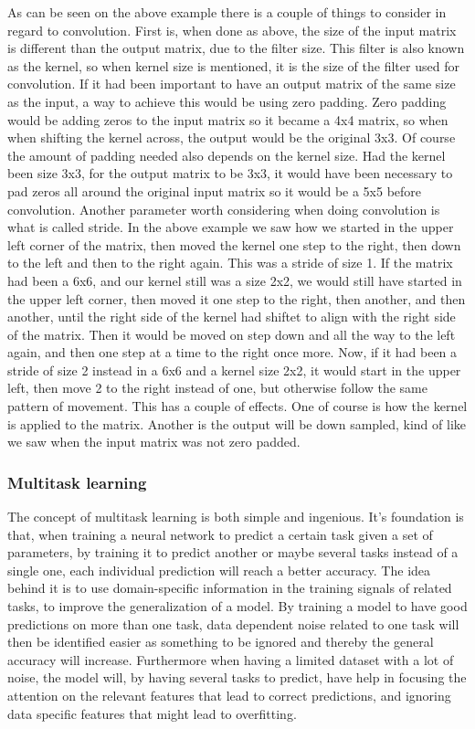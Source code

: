 As can be seen on the above example there is a couple of things to consider in regard to convolution. First is, when done as above, the size of the input matrix is different than the output matrix, due to the filter size. This filter is also known as the kernel, so when kernel size is mentioned, it is the size of the filter used for convolution. If it had been important to have an output matrix of the same size as the input, a way to achieve this would be using zero padding. Zero padding would be adding zeros to the input matrix so it became a 4x4 matrix, so when when shifting the kernel across, the output would be the original 3x3. Of course the amount of padding needed also depends on the kernel size. Had the kernel been size 3x3, for the output matrix to be 3x3, it would have been necessary to pad zeros all around the original input matrix so it would be a 5x5 before convolution. Another parameter worth considering when doing convolution is what is called stride. In the above example we saw how we started in the upper left corner of the matrix, then moved the kernel one step to the right, then down to the left and then to the right again. This was a stride of size 1. If the matrix had been a 6x6, and our kernel still was a size 2x2, we would still have started in the upper left corner, then moved it one step to the right, then another, and then another, until the right side of the kernel had shiftet to align with the right side of the matrix. Then it would be moved on step down and all the way to the left again, and then one step at a time to the right once more. Now, if it had been a stride of size 2 instead in a 6x6 and a kernel size 2x2, it would start in the upper left, then move 2 to the right instead of one, but otherwise follow the same pattern of movement. This has a couple of effects. One of course is how the kernel is applied to the matrix. Another is the output will be down sampled, kind of like we saw when the input matrix was not zero padded.



\subsubsection{Multitask learning}

The concept of multitask learning is both simple and ingenious. It's foundation is that, when training a neural network to predict a certain task given a set of parameters, by training it to predict another or maybe several tasks instead of a single one, each individual prediction will reach a better accuracy. The idea behind it is to use domain-specific information in the training signals of related tasks, to improve the generalization of a model. By training a model to have good predictions on more than one task, data dependent noise related to one task will then be identified easier as something to be ignored and thereby the general accuracy will increase. Furthermore when having a limited dataset with a lot of noise, the model will, by having several tasks to predict, have help in focusing the attention on the relevant features that lead to correct predictions, and ignoring data specific features that might lead to overfitting. 

